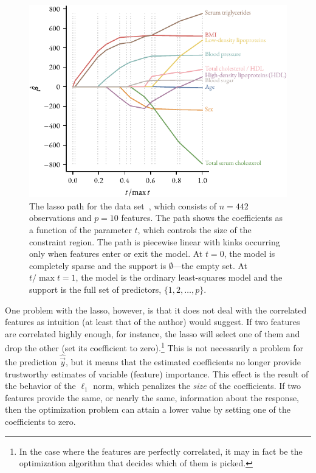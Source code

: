 \begin{figure}
  \centering
  \includegraphics[]{figures/lasso-path.pdf}
  \caption{%
    The lasso path for the  data set~\parencite{efron2004}, which consists of \(n=442\) observations and \(p=10\) features. The path shows the coefficients as a function of the parameter \(t\), which controls the size of the constraint region. The path is piecewise linear with kinks occurring only when features enter or exit the model.
    At \(t = 0\), the model is completely sparse and the support is \(\emptyset\)---the empty set. At \(t/\max t = 1\), the model is the ordinary least-squares model and the support is the full set of predictors, \(\{1,2,\dots,p\}\).
  }
  \label{fig:lasso-path}
\end{figure}

One problem with the lasso, however, is that it does not deal with the correlated features as intuition (at least that of the author) would suggest. If two features are correlated highly enough, for instance, the lasso will select one of them and drop the other (set its coefficient to zero).\footnote{In the case where the features are perfectly correlated, it may in fact be the optimization algorithm that decides which of them is picked.} This is not necessarily a problem for the prediction \(\hat{\vec{y}}\), but it means that the estimated coefficients no longer provide trustworthy estimates of variable (feature) importance. This effect is the result of the behavior of the \(\ell_1\) norm, which penalizes the \emph{size} of the coefficients. If two features provide the same, or nearly the same, information about the response, then the optimization problem can attain a lower value by setting one of the coefficients to zero.

